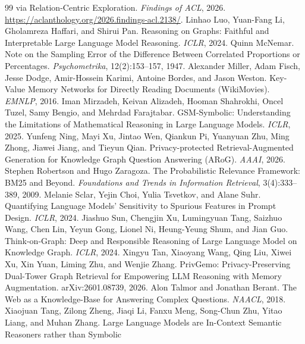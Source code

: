 \documentclass[10pt]{article} %
\begin{document}
\begin{thebibliography}{99}
via Relation-Centric Exploration. \emph{Findings of ACL}, 2026.
\url{https://aclanthology.org/2026.findings-acl.2138/}.
Linhao Luo, Yuan-Fang Li, Gholamreza Haffari, and Shirui Pan.
Reasoning on Graphs: Faithful and Interpretable Large Language Model Reasoning.
\emph{ICLR}, 2024.
Quinn McNemar.
Note on the Sampling Error of the Difference Between Correlated Proportions
or Percentages. \emph{Psychometrika}, 12(2):153--157, 1947.
Alexander Miller, Adam Fisch, Jesse Dodge, Amir-Hossein Karimi, Antoine Bordes,
and Jason Weston.
Key-Value Memory Networks for Directly Reading Documents (WikiMovies).
\emph{EMNLP}, 2016.
Iman Mirzadeh, Keivan Alizadeh, Hooman Shahrokhi, Oncel Tuzel, Samy Bengio, and
Mehrdad Farajtabar.
GSM-Symbolic: Understanding the Limitations of Mathematical Reasoning in Large
Language Models. \emph{ICLR}, 2025.
Yunfeng Ning, Mayi Xu, Jintao Wen, Qiankun Pi, Yuanyuan Zhu, Ming Zhong,
Jiawei Jiang, and Tieyun Qian.
Privacy-protected Retrieval-Augmented Generation for Knowledge Graph Question
Answering (ARoG). \emph{AAAI}, 2026.
Stephen Robertson and Hugo Zaragoza.
The Probabilistic Relevance Framework: {BM25} and Beyond.
\emph{Foundations and Trends in Information Retrieval}, 3(4):333--389, 2009.
Melanie Sclar, Yejin Choi, Yulia Tsvetkov, and Alane Suhr.
Quantifying Language Models' Sensitivity to Spurious Features in Prompt Design.
\emph{ICLR}, 2024.
Jiashuo Sun, Chengjin Xu, Lumingyuan Tang, Saizhuo Wang, Chen Lin, Yeyun Gong,
Lionel Ni, Heung-Yeung Shum, and Jian Guo.
Think-on-Graph: Deep and Responsible Reasoning of Large Language Model on
Knowledge Graph. \emph{ICLR}, 2024.
Xingyu Tan, Xiaoyang Wang, Qing Liu, Xiwei Xu, Xin Yuan, Liming Zhu, and
Wenjie Zhang.
PrivGemo: Privacy-Preserving Dual-Tower Graph Retrieval for Empowering LLM
Reasoning with Memory Augmentation. arXiv:2601.08739, 2026.
Alon Talmor and Jonathan Berant.
The Web as a Knowledge-Base for Answering Complex Questions.
\emph{NAACL}, 2018.
Xiaojuan Tang, Zilong Zheng, Jiaqi Li, Fanxu Meng, Song-Chun Zhu, Yitao Liang,
and Muhan Zhang.
Large Language Models are In-Context Semantic Reasoners rather than Symbolic

\end{thebibliography}
\end{document}
